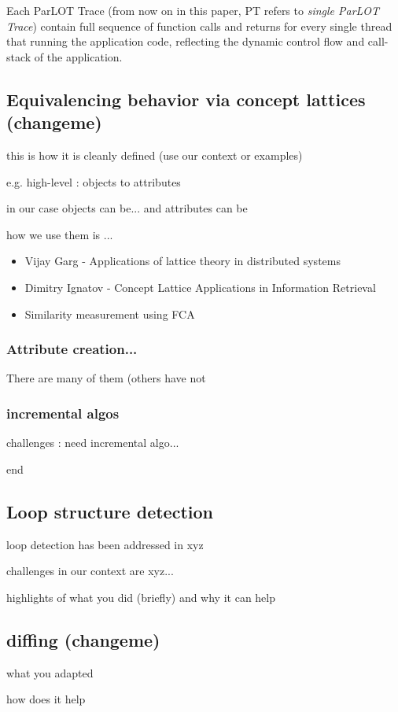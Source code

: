 Each ParLOT Trace (from now on in this paper, PT refers to \textit{single ParLOT Trace}) contain full sequence of function calls and returns for every single thread that running the application code, reflecting the dynamic control flow and call-stack of the application.

\subsection{Equivalencing behavior via concept lattices (changeme)}

this is how it is cleanly defined (use our context or examples)

e.g. high-level : objects to attributes

in our case objects can be... and attributes can be

how we use them is ...


\begin{itemize}
\item Vijay Garg - Applications of lattice theory in distributed systems

\item Dimitry Ignatov \cite{ignatov} - Concept Lattice Applications in Information Retrieval

\item \cite{clbook} \cite{clconst} \cite{bender05} \citep{latticeForDistConst} 

Similarity measurement using FCA \cite{Alqadah2011}
\end{itemize}



\subsubsection{Attribute creation...}

There are many of them (others have not 

\subsubsection{incremental algos}

challenges : need incremental algo...

end




\subsection{Loop structure detection}

loop detection has been addressed in xyz

challenges in our context are xyz...

highlights of what you did (briefly) and why it can help

\subsection{diffing (changeme)}


what you adapted

how does it help

\cite{diff-myers}
